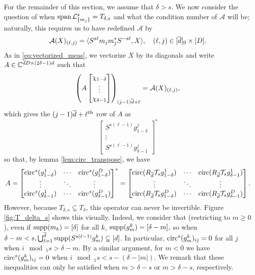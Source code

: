For the remainder of this section, we assume that $\delta > s$.  We now consider the question of when $\operatorname{span} \mathcal{L}_{\{m_j\}}^s = T_{\delta, s}$ and what the condition number of $\mathcal{A}$ will be; naturally, this requires us to have redefined $\mathcal{A}$ by \[\mathcal{A}(X)_{(\ell, j)} = \langle S^{s \ell} m_j m_j^* S^{-s \ell}, X \rangle, \quad (\ell, j) \in [\overline{d}]_0 \times [D].\]  As in \eqref{eq:vectorized_meas}, we vectorize $X$ by its diagonals and write $A \in \mathbb{C}^{\overline{d} D \times (2 \delta - 1) d}$ such that \begin{equation*}\left(A \begin{bmatrix} \chi_{1 - \delta} \\ \vdots \\ \chi_{\delta - 1} \end{bmatrix}\right)_{(j-1) \dbar + \ell} = \mathcal{A}(X)_{(\ell, j)}, %
\end{equation*} which gives the $(j - 1) \overline{d} + \ell^{\text{th}}$ row of $A$ as \[\begin{bmatrix} S^{s (\ell - 1)} g_{1 - \delta}^j \\ \vdots \\ S^{s (\ell - 1)} g_{\delta - 1}^j \end{bmatrix}^*\] so that, by lemma \ref{lem:circ_transpose}, we have \begin{equation} A = \begin{bmatrix} \operatorname{circ}^s(g_{1 - \delta}^1) & \cdots & \operatorname{circ}^s(g_{1 - \delta}^D) \\ \vdots & \ddots & \vdots \\ \operatorname{circ}^s(g_{\delta - 1}^1) & \cdots & \operatorname{circ}^s(g_{\delta - 1}^D) \end{bmatrix}^* = \begin{bmatrix} \operatorname{circ}(R_{\overline{d}} \mathcal{T}_s g_{1 - \delta}^1) & \cdots & \operatorname{circ}(R_{\overline{d}} \mathcal{T}_s g_{\delta - 1}^1) \\ \vdots & \ddots & \vdots \\ \operatorname{circ}(R_{\overline{d}} \mathcal{T}_s g_{1 - \delta}^D) & \cdots & \operatorname{circ}(R_{\overline{d}} \mathcal{T}_s g_{\delta - 1}^D) \end{bmatrix}. \label{eq:A_block_ptych} \end{equation}  However, because $T_{\delta, s} \subsetneq T_\delta$, this operator can never be invertible.  Figure \ref{fig:T_delta_s} shows this visually.  Indeed, we consider that (restricting to $m \ge 0$), even if $\operatorname{supp}(m_k) = [\delta]$ for all $k$, $\operatorname{supp}(g^k_m) = [\delta - m],$ so when $\delta - m < s, \bigcup_{\ell = 1}^{\overline{d}} \operatorname{supp}(S^{s (\ell - 1)} g^k_m) \subsetneq [d]$.  In particular, $\operatorname{circ}^s(g^k_m)_{ij} = 0$ for all $j$ when $i \mod_1 s > \delta - m$.  By a similar argument, for $m < 0$ we have $\operatorname{circ}^s(g_m^k)_{ij} = 0$ when $i \mod_1 s < s - (\delta - |m|)$.  We remark that these inequalities can only be satisfied when $m > \delta - s$ or $m > \delta - s$, respectively.

